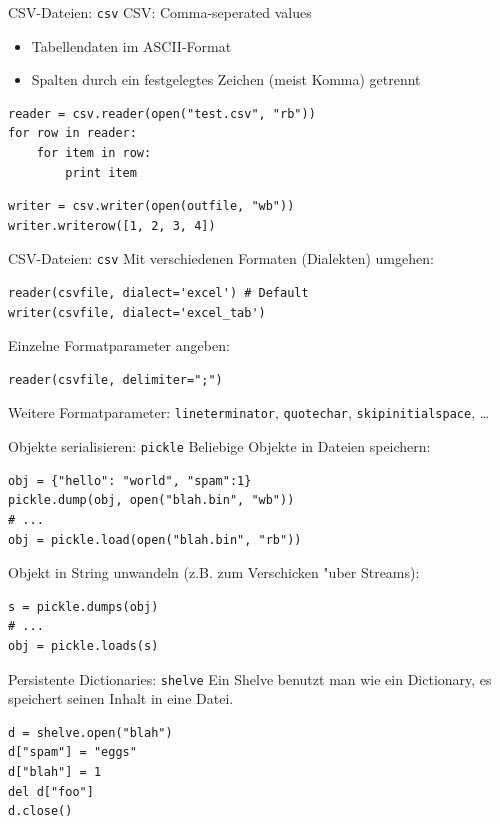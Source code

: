 \begin{frame}[fragile]{CSV-Dateien: \texttt{csv}}
CSV: Comma-seperated values
\begin{itemize}
\item Tabellendaten im ASCII-Format
\item Spalten durch ein festgelegtes Zeichen (meist Komma) getrennt
\end{itemize}
\begin{lstlisting}[style=Python]
reader = csv.reader(open("test.csv", "rb"))
for row in reader:
    for item in row: 
        print item
\end{lstlisting}
\begin{lstlisting}[style=Python]
writer = csv.writer(open(outfile, "wb"))
writer.writerow([1, 2, 3, 4])
\end{lstlisting}
\end{frame}

\begin{frame}[fragile]{CSV-Dateien: \texttt{csv}}
Mit verschiedenen Formaten (Dialekten) umgehen:
\begin{lstlisting}[style=Python]
reader(csvfile, dialect='excel') # Default
writer(csvfile, dialect='excel_tab')
\end{lstlisting}
\vspace*{3mm}
Einzelne Formatparameter angeben:
\begin{lstlisting}[style=Python]
reader(csvfile, delimiter=";")
\end{lstlisting}
Weitere Formatparameter: \texttt{lineterminator}, \texttt{quotechar}, \texttt{skipinitialspace}, \dots
\end{frame}

\begin{frame}[fragile]{Objekte serialisieren: \texttt{pickle}}
Beliebige Objekte in Dateien speichern:
\begin{lstlisting}[style=Python]
obj = {"hello": "world", "spam":1}
pickle.dump(obj, open("blah.bin", "wb"))
# ...
obj = pickle.load(open("blah.bin", "rb"))
\end{lstlisting}
Objekt in String unwandeln (z.B. zum Verschicken "uber Streams):
\begin{lstlisting}[style=Python]
s = pickle.dumps(obj)
# ...
obj = pickle.loads(s)
\end{lstlisting}
\end{frame}

\begin{frame}[fragile]{Persistente Dictionaries: \texttt{shelve}}
Ein Shelve benutzt man wie ein Dictionary, es speichert seinen Inhalt in eine Datei.
\begin{lstlisting}[style=Python]
d = shelve.open("blah")
d["spam"] = "eggs"
d["blah"] = 1
del d["foo"]   
d.close()  
\end{lstlisting}
\end{frame}

